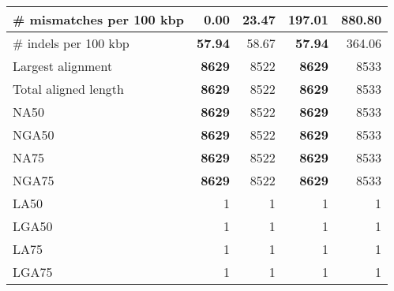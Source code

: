 \documentclass[12pt,a4paper]{article}
\begin{document}
\begin{table}[ht]
\begin{center}
\begin{tabular}{|l*{4}{|r}|}
\# mismatches per 100 kbp & {\bf 0.00} & 23.47 & 197.01 & 880.80 \\ \hline
\# indels per 100 kbp & {\bf 57.94} & 58.67 & {\bf 57.94} & 364.06 \\ \hline
Largest alignment & {\bf 8629} & 8522 & {\bf 8629} & 8533 \\ \hline
Total aligned length & {\bf 8629} & 8522 & {\bf 8629} & 8533 \\ \hline
NA50 & {\bf 8629} & 8522 & {\bf 8629} & 8533 \\ \hline
NGA50 & {\bf 8629} & 8522 & {\bf 8629} & 8533 \\ \hline
NA75 & {\bf 8629} & 8522 & {\bf 8629} & 8533 \\ \hline
NGA75 & {\bf 8629} & 8522 & {\bf 8629} & 8533 \\ \hline
LA50 & 1 & 1 & 1 & 1 \\ \hline
LGA50 & 1 & 1 & 1 & 1 \\ \hline
LA75 & 1 & 1 & 1 & 1 \\ \hline
LGA75 & 1 & 1 & 1 & 1 \\ \hline
\end{tabular}
\end{center}
\end{table}
\end{document}
